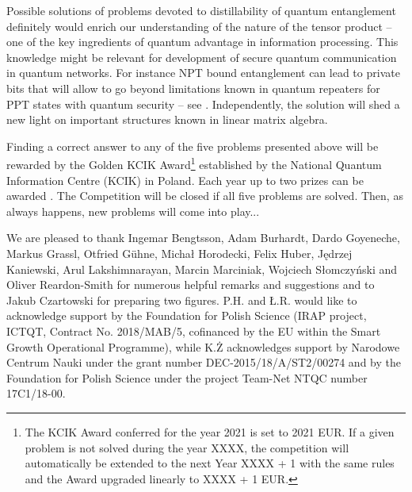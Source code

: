 \documentclass[english,aps,pra,nofootinbib,twocolumn,superscriptaddress]{revtex4-1}
\newcommand{\1}{{\rm 1\hspace{-0.9mm}l}}
\begin{document}
Possible solutions of problems devoted to distillability of quantum entanglement
 definitely would enrich our understanding of the nature of the tensor product -- 
 one of the key ingredients of quantum advantage in information processing. 
This knowledge might be relevant for development of  secure quantum communication 
in quantum networks. For instance NPT bound entanglement can 
lead to private bits that will allow to go beyond limitations known 
in quantum repeaters for PPT states with quantum security -- see \cite{Bauml15}.
Independently, the solution will shed a new light on important structures
known in linear matrix algebra.

\medskip

Finding a correct answer to any of the five problems presented above 
will be rewarded  by the Golden KCIK Award\footnote{The KCIK Award 
conferred for the year 2021 is set to 2021 EUR. 
If a given problem is not solved during
the year XXXX, the competition will automatically be extended to the next Year XXXX + 1 with the same rules and the  Award upgraded linearly to XXXX + 1 EUR.}
 established 
by the National Quantum Information Centre (KCIK) in
Poland. Each year up to two prizes can be awarded \cite{KCIK}.
The Competition will be closed if all five problems are solved. 
Then, as always happens, new problems will come into play...


\begin{acknowledgements}
We are pleased to thank Ingemar Bengtsson, Adam Burhardt, 
Dardo Goyeneche, Markus Grassl,   Otfried  G{\"u}hne,
Micha{\l} Horodecki, Felix Huber,  J\k{e}drzej Kaniewski, 
Arul Lakshimnarayan, Marcin Marciniak, Wojciech S{\l}omczy{\'n}ski
and Oliver Reardon-Smith for numerous helpful remarks and suggestions
and  to  Jakub Czartowski for preparing two figures.
 P.H. and {\L}.R. would like to acknowledge support by the
Foundation for Polish Science (IRAP project, ICTQT, Contract
No. 2018/MAB/5, cofinanced by the EU within the
Smart Growth Operational Programme),
while K.{\.Z} acknowledges support
by Narodowe Centrum Nauki under the grant number DEC-2015/18/A/ST2/00274 
and by the Foundation for Polish Science under the project 
Team-Net NTQC number 17C1/18-00.

\end{acknowledgements}
\end{document}
